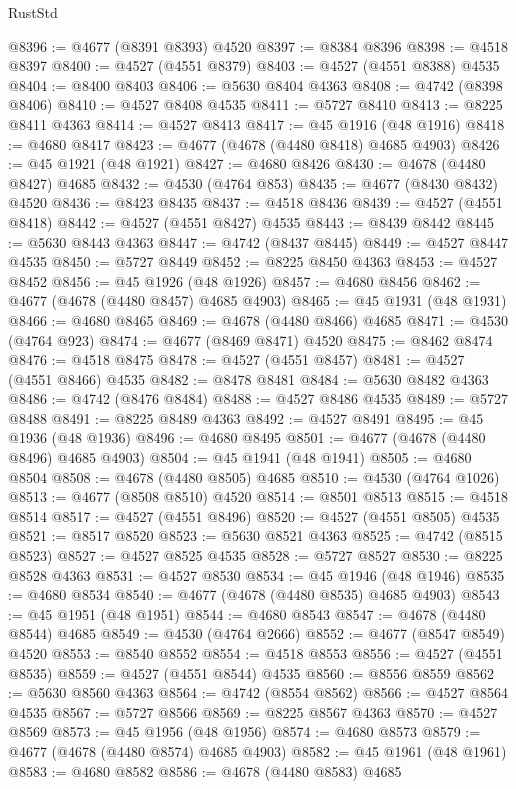 \begin{lexlean}{RustStd}
\begin{coremodule}
@8396 := @4677 (@8391 @8393) @4520
@8397 := @8384 @8396
@8398 := @4518 @8397
@8400 := @4527 (@4551 @8379)
@8403 := @4527 (@4551 @8388) @4535
@8404 := @8400 @8403
@8406 := @5630 @8404 @4363
@8408 := @4742 (@8398 @8406)
@8410 := @4527 @8408 @4535
@8411 := @5727 @8410
@8413 := @8225 @8411 @4363
@8414 := @4527 @8413
@8417 := @45 @1916 (@48 @1916)
@8418 := @4680 @8417
@8423 := @4677 (@4678 (@4480 @8418) @4685 @4903)
@8426 := @45 @1921 (@48 @1921)
@8427 := @4680 @8426
@8430 := @4678 (@4480 @8427) @4685
@8432 := @4530 (@4764 @853)
@8435 := @4677 (@8430 @8432) @4520
@8436 := @8423 @8435
@8437 := @4518 @8436
@8439 := @4527 (@4551 @8418)
@8442 := @4527 (@4551 @8427) @4535
@8443 := @8439 @8442
@8445 := @5630 @8443 @4363
@8447 := @4742 (@8437 @8445)
@8449 := @4527 @8447 @4535
@8450 := @5727 @8449
@8452 := @8225 @8450 @4363
@8453 := @4527 @8452
@8456 := @45 @1926 (@48 @1926)
@8457 := @4680 @8456
@8462 := @4677 (@4678 (@4480 @8457) @4685 @4903)
@8465 := @45 @1931 (@48 @1931)
@8466 := @4680 @8465
@8469 := @4678 (@4480 @8466) @4685
@8471 := @4530 (@4764 @923)
@8474 := @4677 (@8469 @8471) @4520
@8475 := @8462 @8474
@8476 := @4518 @8475
@8478 := @4527 (@4551 @8457)
@8481 := @4527 (@4551 @8466) @4535
@8482 := @8478 @8481
@8484 := @5630 @8482 @4363
@8486 := @4742 (@8476 @8484)
@8488 := @4527 @8486 @4535
@8489 := @5727 @8488
@8491 := @8225 @8489 @4363
@8492 := @4527 @8491
@8495 := @45 @1936 (@48 @1936)
@8496 := @4680 @8495
@8501 := @4677 (@4678 (@4480 @8496) @4685 @4903)
@8504 := @45 @1941 (@48 @1941)
@8505 := @4680 @8504
@8508 := @4678 (@4480 @8505) @4685
@8510 := @4530 (@4764 @1026)
@8513 := @4677 (@8508 @8510) @4520
@8514 := @8501 @8513
@8515 := @4518 @8514
@8517 := @4527 (@4551 @8496)
@8520 := @4527 (@4551 @8505) @4535
@8521 := @8517 @8520
@8523 := @5630 @8521 @4363
@8525 := @4742 (@8515 @8523)
@8527 := @4527 @8525 @4535
@8528 := @5727 @8527
@8530 := @8225 @8528 @4363
@8531 := @4527 @8530
@8534 := @45 @1946 (@48 @1946)
@8535 := @4680 @8534
@8540 := @4677 (@4678 (@4480 @8535) @4685 @4903)
@8543 := @45 @1951 (@48 @1951)
@8544 := @4680 @8543
@8547 := @4678 (@4480 @8544) @4685
@8549 := @4530 (@4764 @2666)
@8552 := @4677 (@8547 @8549) @4520
@8553 := @8540 @8552
@8554 := @4518 @8553
@8556 := @4527 (@4551 @8535)
@8559 := @4527 (@4551 @8544) @4535
@8560 := @8556 @8559
@8562 := @5630 @8560 @4363
@8564 := @4742 (@8554 @8562)
@8566 := @4527 @8564 @4535
@8567 := @5727 @8566
@8569 := @8225 @8567 @4363
@8570 := @4527 @8569
@8573 := @45 @1956 (@48 @1956)
@8574 := @4680 @8573
@8579 := @4677 (@4678 (@4480 @8574) @4685 @4903)
@8582 := @45 @1961 (@48 @1961)
@8583 := @4680 @8582
@8586 := @4678 (@4480 @8583) @4685

\end{coremodule}
\end{lexlean}
